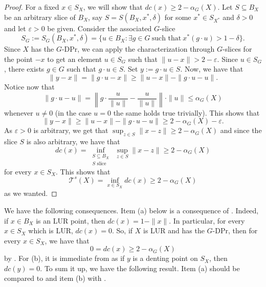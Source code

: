 \documentclass[a4paper,12pt]{amsart}
\theoremstyle{definition}
\theoremstyle{definition}
\theoremstyle{remark}
\numberwithin{equation}{section}
\renewcommand{\geq}{\geqslant}
\renewcommand{\leq}{\leqslant}
\newcommand{\<}{\langle}
\renewcommand{\>}{\rangle}
\newcommand{\e}{\varepsilon}
\begin{document}
	\begin{proof} For a fixed $x \in S_X$, we will show that $dc(x) \geq 2 - \alpha_G(X)$. Let $S \subseteq B_X$ be an arbitrary slice of $B_X$, say $S = S(B_X, x^*, \delta)$ for some $x^* \in S_{X^*}$ and $\delta > 0$ and let $\e > 0$ be given. Consider the associated $G$-slice 
		\begin{equation*}
			S_G := S_G(B_X, x^*, \delta) = \{ u \in B_X: \exists g \in G \ \mbox{such that} \ x^*(g \cdot u) > 1 - \delta \}.
		\end{equation*}
		Since $X$ has the $G$-DPr, we can apply the characterization through $G$-slices for the point $-x$ to get an element $u \in S_G$ such that $\|u-x\| > 2 - \e$. Since $u \in S_G$, there exists $g \in G$ such that $g\cdot u \in S$. Set $y:= g\cdot u \in S$. Now, we have that 
		\begin{equation*}
			\|y - x\| = \|g \cdot u - x\| \geq \|u-x\| - \|g \cdot u - u\|. 
		\end{equation*}
		Notice now that 
		\begin{equation*}
			\|g \cdot u - u\| = \left\| g \cdot \frac{u}{\|u\|} - \frac{u}{\|u\|} \right\| \cdot \|u\| \leq \alpha_G(X)
		\end{equation*}
		whenever $u\not=0$ (in the case $u=0$ the same holds true trivially). This shows that 
		\begin{equation*}
			\| y - x\| \geq \|u-x\| - \|g \cdot u - u\| \geq 2 - \alpha_G(X) - \e.
		\end{equation*}
		As $\e > 0$ is arbitrary, we get that $\sup_{z \in S} \|x-z\| \geq 2 - \alpha_G(X)$ and since the slice $S$ is also arbitrary, we have that 
		\begin{equation*}
			dc(x)=\inf_{\substack{S\subseteq B_X\\ S\text{ slice}}}\ \sup_{z\in S}\|x-z\| \geq 2 - \alpha_G(X) 
		\end{equation*}
		for every $x \in S_X$. This shows that 
		\begin{equation*}
			\mathcal{T}^s(X) = \inf_{x \in S_X} dc(x) \geq 2 - \alpha_G(X) 
		\end{equation*}
		as we wanted. 
	\end{proof} 
	
	
	We have the following consequences. Item (a) below is a consequence of \cite[Proposition 2.10]{ChoiJung2024}. Indeed, if $x \in B_X$ is an LUR point, then $dc(x) = 1 - \|x\|$. In particular, for every $x \in S_X$ which is LUR, $dc(x) = 0$. So, if $X$ is LUR and has the $G$-DPr, then for every $x \in S_X$, we have that 
	\begin{equation*}
		0 = dc(x) \geq 2 - \alpha_G(X)
	\end{equation*}
	by . For (b), it is immediate from \cite[Lemma 2.8]{ChoiJung2024} as if $y$ is a denting point on $S_X$, then $dc(y) = 0$. To sum it up, we have the following result. Item (a) should be compared to  and item (b) with .
	
\end{document}

